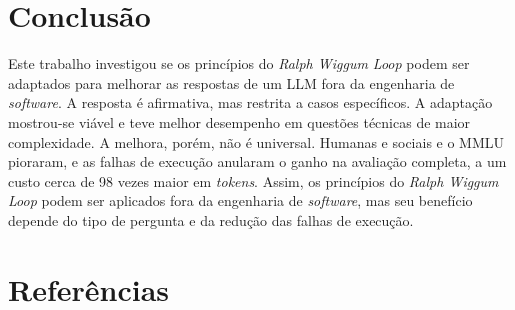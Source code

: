 \documentclass[a4paper,10pt, twocolumn]{article}
\begin{document}
\section{Conclusão}

Este trabalho investigou se os princípios do \textit{Ralph Wiggum Loop} podem ser adaptados para melhorar as respostas de um LLM fora da engenharia de \textit{software}. A resposta é afirmativa, mas restrita a casos específicos. A adaptação mostrou-se viável e teve melhor desempenho em questões técnicas de maior complexidade. A melhora, porém, não é universal. Humanas e sociais e o MMLU pioraram, e as falhas de execução anularam o ganho na avaliação completa, a um custo cerca de 98 vezes maior em \textit{tokens}. Assim, os princípios do \textit{Ralph Wiggum Loop} podem ser aplicados fora da engenharia de \textit{software}, mas seu benefício depende do tipo de pergunta e da redução das falhas de execução.

\section{Referências}
\printbibliography[heading=none]
\end{document}
